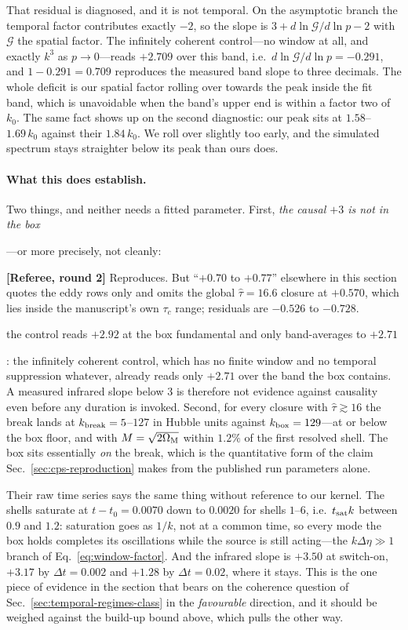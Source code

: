 \documentclass[10pt,prd,aps,nobibnotes,superscriptaddress,preprintnumbers,notitlepage]{revtex4-1}
\newcommand{\rev}[1]{\par\noindent\begin{tcolorbox}[colback=blue!4,colframe=blue!55,
    boxrule=0.5pt,left=3pt,right=3pt,top=2pt,bottom=2pt,breakable]
    \footnotesize\textcolor{blue!65!black}{\textbf{[Referee, round 2]} #1}\end{tcolorbox}\par}
\newcommand{\revX}[1]{\par\noindent\begin{tcolorbox}[colback=red!5,colframe=red!70!black,
    boxrule=1pt,left=3pt,right=3pt,top=2pt,bottom=2pt,breakable]
    \footnotesize\textcolor{red!70!black}{\textbf{[Referee, round 2 --- BLOCKING]} #1}\end{tcolorbox}\par}
\newcommand{\rev}[1]{}\newcommand{\revX}[1]{}
\newcommand{\add}[1]{{\color{red}#1}}
\newcommand{\add}[1]{#1}
\begin{document}
{That residual is diagnosed, and it is not temporal. On the asymptotic branch the temporal
factor contributes exactly $-2$, so the slope is $3+d\ln\mathcal G/d\ln p-2$ with
$\mathcal G$ the spatial factor. The infinitely coherent control---no window at all, and
exactly $k^{3}$ as $p\to0$---reads $+2.709$ over this band, i.e.\
$d\ln\mathcal G/d\ln p=-0.291$, and $1-0.291=0.709$ reproduces the measured band slope to
three decimals. The whole deficit is our spatial factor rolling over towards the peak
inside the fit band, which is unavoidable when the band's upper end is within a factor
two of $k_0$. The same fact shows up on the second diagnostic: our peak sits at
$1.58$--$1.69\,k_0$ against their $1.84\,k_0$. We roll over slightly too early, and the
simulated spectrum stays straighter below its peak than ours does.

\paragraph{What this does establish.} Two things, and neither needs a fitted parameter.
First, \emph{the causal $+3$ is not in the box}\add{---or more precisely, not cleanly:
\rev{Reproduces. But ``$+0.70$ to $+0.77$'' elsewhere in this section quotes the eddy
rows only and omits the global $\hat\tau=16.6$ closure at $+0.570$, which lies inside the
manuscript's own $\tau_c$ range; residuals are $-0.526$ to $-0.728$.}
the control reads $+2.92$ at the box fundamental and only band-averages to $+2.71$}: the
infinitely coherent control, which
has no finite window and no temporal suppression whatever, already reads only $+2.71$
over the band the box contains. A measured infrared slope below $3$ is therefore not
evidence against causality even before any duration is invoked. Second, for every closure
with $\hat\tau\gtrsim16$ the break lands at $k_{\rm break}=5$--$127$ in Hubble units
against $k_{\rm box}=129$---at or below the box floor, and with $M=\sqrt{2\Omega_{\rm M}}$
within $1.2\%$ of the first resolved shell. The box sits essentially \emph{on} the break,
which is the quantitative form of the claim Sec.~\ref{sec:cps-reproduction} makes from
the published run parameters alone.

Their raw time series says the same thing without reference to our kernel. The shells
saturate at $t-t_0=0.0070$ down to $0.0020$ for shells $1$--$6$, i.e.\ $t_{\rm sat}k$
between $0.9$ and $1.2$: saturation goes as $1/k$, not at a common time, so every mode the
box holds completes its oscillations while the source is still acting---the
$k\Delta\eta\gg1$ branch of Eq.~\eqref{eq:window-factor}. And the infrared slope is
$+3.50$ at switch-on, $+3.17$ by $\Delta t=0.002$ and $+1.28$ by $\Delta t=0.02$, where it
stays. This is the one piece of evidence in the section that bears on the coherence
question of Sec.~\ref{sec:temporal-regimes-class} in the \emph{favourable} direction, and
it should be weighed against the build-up bound above, which pulls the other way.

}
\end{document}
